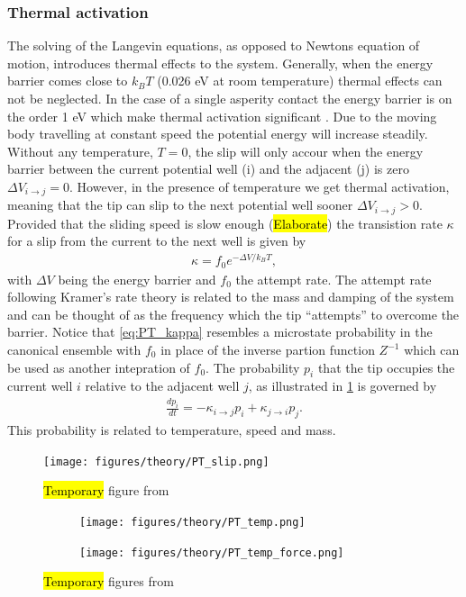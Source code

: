 \subsubsection{Thermal activation}
The solving of the Langevin equations, as opposed to Newtons equation of motion, introduces thermal effects to the system. Generally, when the energy barrier comes close to $k_B T$ (0.026 eV at room temperature) thermal effects can not be neglected. In the case of a single asperity contact the energy barrier is on the order 1 eV which make thermal activation significant \cite{Yalin_2011}. Due to the moving body travelling at constant speed the potential energy will increase steadily. Without any temperature, $T = 0$, the slip will only accour when the energy barrier between the current potential well (i) and the adjacent (j) is zero $\Delta V_{i\to j} = 0$. However, in the presence of temperature we get thermal activation, meaning that the tip can slip to the next potential well sooner $\Delta V_{i\to j} > 0$. Provided that the sliding speed is slow enough (\hl{Elaborate}) the transistion rate $\kappa$ for a slip from the current to the next well is given by
\begin{align}
  \kappa = f_0 e^{-\Delta V / k_B T},
  \label{eq:PT_kappa}
\end{align}
with $\Delta V$ being the energy barrier and $f_0$ the attempt rate. The attempt rate following Kramer’s rate theory \cite{RevModPhys.62.251} is related to the mass and damping of the system and can be thought of as the frequency which the tip ``attempts'' to overcome the barrier. Notice that \cref{eq:PT_kappa} resembles a microstate probability in the canonical ensemble with $f_0$ in place of the inverse partion function $Z^{-1}$ which can be used as another intepration of $f_0$. The probability $p_i$ that the tip occupies the current well $i$ relative to the adjacent well $j$, as illustrated in \cref{fig:PT_slip} is governed by 
\begin{align*}
  \frac{dp_i}{dt} = -\kappa_{i\to j}p_i + \kappa_{j\to i}p_j.
\end{align*}
This probability is related to temperature, speed and mass.

\begin{figure}[H]
  \centering
  \texttt{[image: figures/theory/PT\_slip.png]}
  \caption{\hl{Temporary} figure from \cite{Yalin_2011}}
  \label{fig:PT_slip}
\end{figure}


\begin{figure}[H]
  \centering
  \begin{subfigure}[t]{0.49\textwidth}
      \centering
      \texttt{[image: figures/theory/PT\_temp.png]}
      \caption{}
      \label{fig:PT_temp_a}
  \end{subfigure}
  \hfill
  \begin{subfigure}[t]{0.49\textwidth}
      \centering
      \texttt{[image: figures/theory/PT\_temp\_force.png]}
      \caption{}
      \label{fig:PT_temp_b}
  \end{subfigure}
  \hfill
  \hfill
     \caption{\hl{Temporary} figures from \cite{Yalin_2011}}
     \label{fig:PT_temp}
\end{figure}

